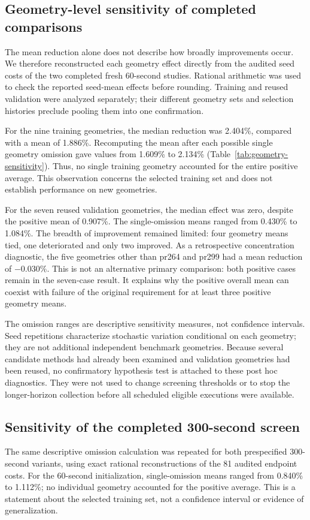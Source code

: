\subsection{Geometry-level sensitivity of completed comparisons}
The mean reduction alone does not describe how broadly improvements occur.
We therefore reconstructed each geometry effect directly from the audited
seed costs of the two completed fresh 60-second studies. Rational arithmetic
was used to check the reported seed-mean effects before rounding. Training
and reused validation were analyzed separately; their different geometry
sets and selection histories preclude pooling them into one confirmation.



For the nine training geometries, the median reduction was 2.404\%, compared
with a mean of 1.886\%. Recomputing the mean after each possible single
geometry omission gave values from 1.609\% to 2.134\%
(Table~\ref{tab:geometry-sensitivity}). Thus, no single training geometry
accounted for the entire positive average. This observation concerns the
selected training set and does not establish performance on new geometries.

For the seven reused validation geometries, the median effect was zero,
despite the positive mean of 0.907\%. The single-omission means ranged from
0.430\% to 1.084\%. The breadth of improvement remained limited: four
geometry means tied, one deteriorated and only two improved. As a
retrospective concentration diagnostic, the five geometries other than
pr264 and pr299 had a mean reduction of $-0.030\%$. This is not an alternative
primary comparison: both positive cases remain in the seven-case result.
It explains why the positive overall mean can coexist with failure of the
original requirement for at least three positive geometry means.

The omission ranges are descriptive sensitivity measures, not confidence
intervals. Seed repetitions characterize stochastic variation conditional
on each geometry; they are not additional independent benchmark geometries.
Because several candidate methods had already been examined and validation
geometries had been reused, no confirmatory hypothesis test is attached to
these post hoc diagnostics. They were not used to change screening
thresholds or to stop the longer-horizon collection before all scheduled
eligible executions were available.

\subsection{Sensitivity of the completed 300-second screen}
\label{sec:awake300-sensitivity}
The same descriptive omission calculation was repeated for both prespecified
300-second variants, using exact rational reconstructions of the 81 audited
endpoint costs. For the 60-second initialization, single-omission means ranged
from 0.840\% to 1.112\%; no individual geometry accounted for the positive
average. This is a statement about the selected training set, not a confidence
interval or evidence of generalization.

